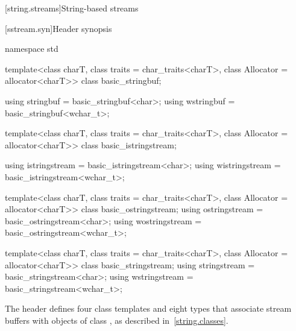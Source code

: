 [string.streams]{String-based streams}

[sstream.syn]{Header  synopsis}

%
%
%
%
%
%
%
%
%
%
%
%
%
%
%
%
%
\begin{codeblock}
namespace std {
  template<class charT, class traits = char_traits<charT>,
           class Allocator = allocator<charT>>
    class basic_stringbuf;

  using stringbuf  = basic_stringbuf<char>;
  using wstringbuf = basic_stringbuf<wchar_t>;

  template<class charT, class traits = char_traits<charT>,
           class Allocator = allocator<charT>>
    class basic_istringstream;

  using istringstream  = basic_istringstream<char>;
  using wistringstream = basic_istringstream<wchar_t>;

  template<class charT, class traits = char_traits<charT>,
           class Allocator = allocator<charT>>
    class basic_ostringstream;
  using ostringstream  = basic_ostringstream<char>;
  using wostringstream = basic_ostringstream<wchar_t>;

  template<class charT, class traits = char_traits<charT>,
           class Allocator = allocator<charT>>
    class basic_stringstream;
  using stringstream  = basic_stringstream<char>;
  using wstringstream = basic_stringstream<wchar_t>;
}
\end{codeblock}

\pnum
The header  defines four class templates
and eight types that associate stream buffers with objects of class
,
%
as described in~\ref{string.classes}.

